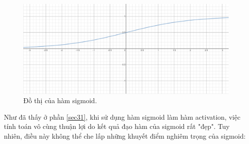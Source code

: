 \begin{figure}[!h]
	\centering
		\includegraphics[width=0.75\columnwidth]{books/artificial-neural-network/chapter03/figure/HamSigmoid.png}
        \caption{Đồ thị của hàm sigmoid.}
        \label{fig:HamSigmoid}
		\centering
\end{figure}

Như đã thấy ở phần \ref{sec31}, khi sử dụng hàm sigmoid làm hàm activation, việc tính toán vô cùng thuận lợi do kết quả đạo hàm của sigmoid rất "đẹp". Tuy nhiên, điều này không thể che lấp những khuyết điểm nghiêm trọng của sigmoid:


